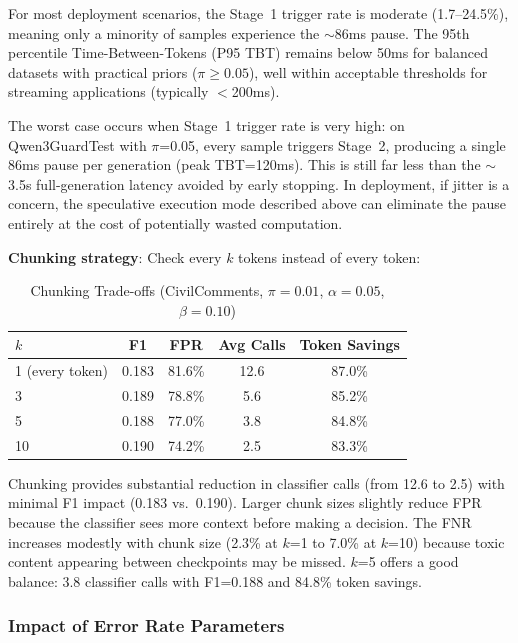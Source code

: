\documentclass[acmtjournal, acmnowidth]{acmart}
\theoremstyle{definition}
\begin{document}
For most deployment scenarios, the Stage~1 trigger rate is moderate (1.7--24.5\%), meaning only a minority of samples experience the ${\sim}$86ms pause. The 95th percentile Time-Between-Tokens (P95 TBT) remains below 50ms for balanced datasets with practical priors ($\pi \geq 0.05$), well within acceptable thresholds for streaming applications (typically $<$200ms).

The worst case occurs when Stage~1 trigger rate is very high: on Qwen3GuardTest with $\pi$=0.05, every sample triggers Stage~2, producing a single 86ms pause per generation (peak TBT=120ms). This is still far less than the ${\sim}$3.5s full-generation latency avoided by early stopping. In deployment, if jitter is a concern, the speculative execution mode described above can eliminate the pause entirely at the cost of potentially wasted computation.

\textbf{Chunking strategy}: Check every $k$ tokens instead of every token:

\begin{table}[h]
\caption{Chunking Trade-offs (CivilComments, $\pi=0.01$, $\alpha=0.05$, $\beta=0.10$)}
\label{tab:chunking}
\begin{tabular}{lcccc}
\toprule
$k$ & F1 & FPR & Avg Calls & Token Savings \\
\midrule
1 (every token) & 0.183 & 81.6\% & 12.6 & 87.0\% \\
3 & 0.189 & 78.8\% & 5.6 & 85.2\% \\
5 & 0.188 & 77.0\% & 3.8 & 84.8\% \\
10 & 0.190 & 74.2\% & 2.5 & 83.3\% \\
\bottomrule
\end{tabular}
\end{table}

Chunking provides substantial reduction in classifier calls (from 12.6 to 2.5) with minimal F1 impact (0.183 vs.\ 0.190). Larger chunk sizes slightly reduce FPR because the classifier sees more context before making a decision. The FNR increases modestly with chunk size (2.3\% at $k$=1 to 7.0\% at $k$=10) because toxic content appearing between checkpoints may be missed. $k$=5 offers a good balance: 3.8 classifier calls with F1=0.188 and 84.8\% token savings.

\subsubsection{Impact of Error Rate Parameters}
\end{document}
